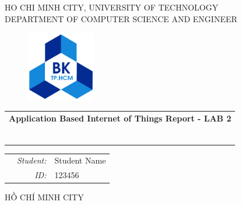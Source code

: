\documentclass[a4paper,11pt]{article}
\theoremstyle{mytheor}
\begin{document}
\begin{titlepage}
\begin{center}
HO CHI MINH CITY, UNIVERSITY OF TECHNOLOGY \\
DEPARTMENT OF COMPUTER SCIENCE AND ENGINEER
\end{center}

\vspace{1cm}

\begin{figure}[h!]
\begin{center}
\includegraphics[width=3cm]{hcmut.png}
\end{center}
\end{figure}

\vspace{2cm}


\begin{center}
\begin{tabular}{c}
\multicolumn{1}{c}{\textbf{{\Large Application Based Internet of Things Report - LAB 2}}}



~~\\

\\
\multicolumn{1}{l}{\textbf{{\Large}}}\\
\\
\textbf{{\Large}}\\

\\
\\

\end{tabular}
\end{center}

\vspace{3cm}

\begin{table}[h]
\begin{tabular}{rrl}
\hspace{5.1cm} 
&\textit{Student: } & Student Name\\
&\textit{ID: } & 123456 \\

\end{tabular}
\end{table}
\vspace{3cm}
\begin{center}
{\footnotesize HỒ CHÍ MINH CITY}
\end{center}
\end{titlepage}
\end{document}
